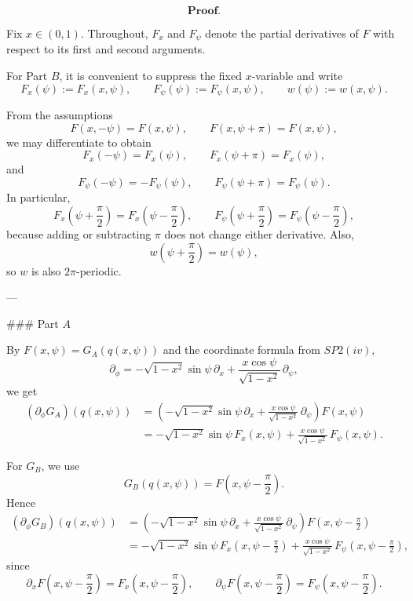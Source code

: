 \[
\textbf{Proof.}
\]

Fix \(x\in(0,1)\). Throughout, \(F_x\) and \(F_\psi\) denote the partial derivatives of \(F\) with respect to its first and second arguments.

For Part \(B\), it is convenient to suppress the fixed \(x\)-variable and write
\[
F_x(\psi):=F_x(x,\psi),\qquad F_\psi(\psi):=F_\psi(x,\psi),\qquad w(\psi):=w(x,\psi).
\]

From the assumptions
\[
F(x,-\psi)=F(x,\psi),\qquad F(x,\psi+\pi)=F(x,\psi),
\]
we may differentiate to obtain
\[
F_x(-\psi)=F_x(\psi),\qquad F_x(\psi+\pi)=F_x(\psi),
\]
and
\[
F_\psi(-\psi)=-F_\psi(\psi),\qquad F_\psi(\psi+\pi)=F_\psi(\psi).
\]
In particular,
\[
F_x\!\left(\psi+\frac{\pi}{2}\right)=F_x\!\left(\psi-\frac{\pi}{2}\right),
\qquad
F_\psi\!\left(\psi+\frac{\pi}{2}\right)=F_\psi\!\left(\psi-\frac{\pi}{2}\right),
\]
because adding or subtracting \(\pi\) does not change either derivative. Also,
\[
w\!\left(\psi+\frac{\pi}{2}\right)=w(\psi),
\]
so \(w\) is also \(2\pi\)-periodic.

---

### Part \(A\)

By \(F(x,\psi)=G_A(q(x,\psi))\) and the coordinate formula from \(SP2(iv)\),
\[
\partial_\phi
=
-\sqrt{1-x^2}\sin\psi\,\partial_x
+
\frac{x\cos\psi}{\sqrt{1-x^2}}\,\partial_\psi,
\]
we get
\[
\begin{aligned}
(\partial_\phi G_A)(q(x,\psi))
&=
\left(
-\sqrt{1-x^2}\sin\psi\,\partial_x
+
\frac{x\cos\psi}{\sqrt{1-x^2}}\,\partial_\psi
\right)F(x,\psi)\\
&=
-\sqrt{1-x^2}\sin\psi\,F_x(x,\psi)
+
\frac{x\cos\psi}{\sqrt{1-x^2}}\,F_\psi(x,\psi).
\end{aligned}
\]

For \(G_B\), we use
\[
G_B(q(x,\psi))=F\!\left(x,\psi-\frac{\pi}{2}\right).
\]
Hence
\[
\begin{aligned}
(\partial_\phi G_B)(q(x,\psi))
&=
\left(
-\sqrt{1-x^2}\sin\psi\,\partial_x
+
\frac{x\cos\psi}{\sqrt{1-x^2}}\,\partial_\psi
\right)
F\!\left(x,\psi-\frac{\pi}{2}\right)\\
&=
-\sqrt{1-x^2}\sin\psi\,F_x\!\left(x,\psi-\frac{\pi}{2}\right)
+
\frac{x\cos\psi}{\sqrt{1-x^2}}\,F_\psi\!\left(x,\psi-\frac{\pi}{2}\right),
\end{aligned}
\]
since
\[
\partial_x F\!\left(x,\psi-\frac{\pi}{2}\right)=F_x\!\left(x,\psi-\frac{\pi}{2}\right),
\qquad
\partial_\psi F\!\left(x,\psi-\frac{\pi}{2}\right)=F_\psi\!\left(x,\psi-\frac{\pi}{2}\right).
\]

